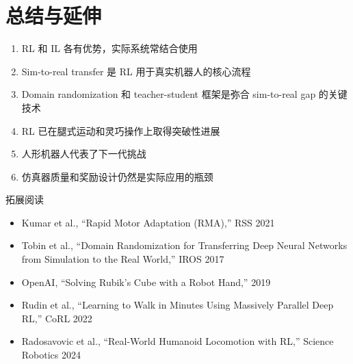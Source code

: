 \section{总结与延伸}

\begin{enumerate}
    \item RL 和 IL 各有优势，实际系统常结合使用
    \item Sim-to-real transfer 是 RL 用于真实机器人的核心流程
    \item Domain randomization 和 teacher-student 框架是弥合 sim-to-real gap 的关键技术
    \item RL 已在腿式运动和灵巧操作上取得突破性进展
    \item 人形机器人代表了下一代挑战
    \item 仿真器质量和奖励设计仍然是实际应用的瓶颈
\end{enumerate}

\begin{knowledgebox}{拓展阅读}
\begin{itemize}
    \item Kumar et al., ``Rapid Motor Adaptation (RMA),'' RSS 2021
    \item Tobin et al., ``Domain Randomization for Transferring Deep Neural Networks from Simulation to the Real World,'' IROS 2017
    \item OpenAI, ``Solving Rubik's Cube with a Robot Hand,'' 2019
    \item Rudin et al., ``Learning to Walk in Minutes Using Massively Parallel Deep RL,'' CoRL 2022
    \item Radosavovic et al., ``Real-World Humanoid Locomotion with RL,'' Science Robotics 2024
\end{itemize}
\end{knowledgebox}


